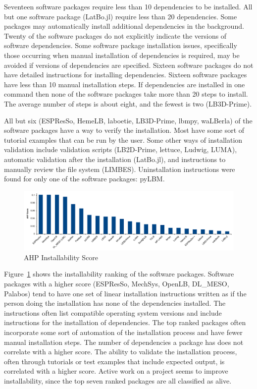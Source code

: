 \documentclass[final, 3p, times, authoryear]{elsarticle}
\begin{document}
Seventeen software packages require less than 10 dependencies to be installed.
All but one software package (LatBo.jl) require less than 20 dependencies. Some
packages may automatically install additional dependencies in the background.
Twenty of the software packages do not explicitly indicate the versions of
software dependencies. Some software package installation issues, specifically
those occurring when manual installation of dependencies is required, may be
avoided if versions of dependencies are specified. Sixteen software packages do
not have detailed instructions for installing dependencies. Sixteen software
packages have less than 10 manual installation steps. If dependencies are
installed in one command then none of the software packages take more than 20
steps to install. The average number of steps is about eight, and the fewest is
two (LB3D-Prime). 

All but six (ESPResSo, HemeLB, laboetie, LB3D-Prime, lbmpy, waLBerla) of the
software packages have a way to verify the installation. Most have some sort of
tutorial examples that can be run by the user. Some other ways of installation
validation include validation scripts (LB2D-Prime, lettuce, Ludwig, LUMA),
automatic validation after the installation (LatBo.jl), and instructions to
manually review the file system (LIMBES).  Uninstallation instructions were
found for only one of the software packages: pyLBM.

\begin{figure}[h!]
	\begin{center}
		\includegraphics[width=1.0\textwidth]{./figures/installability_chart.pdf}
		\caption{AHP Installability Score}
		\label{Fig_Installability}
	\end{center}
\end{figure}

Figure~\ref{Fig_Installability} shows the installability ranking of the software
packages. Software packages with a higher score (ESPResSo, MechSys, OpenLB,
DL\_MESO, Palabos) tend to have one set of linear installation instructions
written as if the person doing the installation has none of the dependencies
installed. The instructions often list compatible operating system versions and
include instructions for the installation of dependencies. The top ranked
packages often incorporate some sort of automation of the installation process
and have fewer manual installation steps. The number of dependencies a package
has does not correlate with a higher score. The ability to validate the
installation process, often through tutorials or test examples that include
expected output, is correlated with a higher score. Active work on a project
seems to improve installability, since the top seven ranked packages are all
classified as alive. 
 
\end{document}
